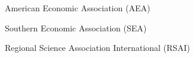 {American Economic Association (AEA)}
{}

{Southern Economic Association (SEA)}
{}

{Regional Science Association International (RSAI)}
{}